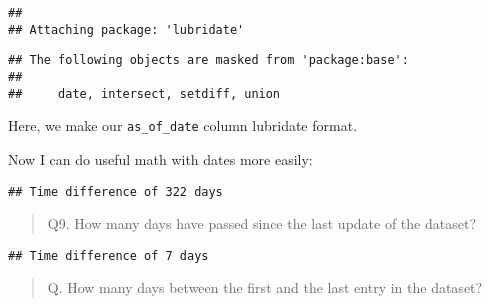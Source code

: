 \documentclass[
]{article}
\newenvironment{Shaded}{\begin{snugshade}}{\end{snugshade}}
\newcommand{\CommentTok}[1]{\textcolor[rgb]{0.56,0.35,0.01}{\textit{#1}}}
\newcommand{\DecValTok}[1]{\textcolor[rgb]{0.00,0.00,0.81}{#1}}
\newcommand{\FunctionTok}[1]{\textcolor[rgb]{0.00,0.00,0.00}{#1}}
\newcommand{\NormalTok}[1]{#1}
\newcommand{\OtherTok}[1]{\textcolor[rgb]{0.56,0.35,0.01}{#1}}
\newcommand{\SpecialCharTok}[1]{\textcolor[rgb]{0.00,0.00,0.00}{#1}}
\begin{document}
\begin{verbatim}
## 
## Attaching package: 'lubridate'
\end{verbatim}

\begin{verbatim}
## The following objects are masked from 'package:base':
## 
##     date, intersect, setdiff, union
\end{verbatim}

Here, we make our \texttt{as\_of\_date} column lubridate format.

\begin{Shaded}
\end{Shaded}

Now I can do useful math with dates more easily:

\begin{Shaded}
\end{Shaded}

\begin{verbatim}
## Time difference of 322 days
\end{verbatim}

\begin{quote}
Q9. How many days have passed since the last update of the dataset?
\end{quote}

\begin{Shaded}
\end{Shaded}

\begin{verbatim}
## Time difference of 7 days
\end{verbatim}

\begin{quote}
Q. How many days between the first and the last entry in the dataset?
\end{quote}
\end{document}
